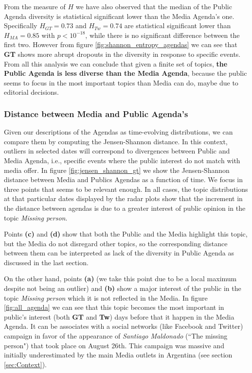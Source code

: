 \documentclass{bmcart}
\begin{document}
\par From the measure of $H$ we have also observed that the median of the Public Agenda diversity is statistical significant lower than the Media Agenda's one.
Specifically $H_{GT} = 0.73$ and $H_{Tw} = 0.74$ are statistical significant lower than $H_{MA} = 0.85$ with $p < 10^{-18}$, while there is no significant difference between the first two. 
However from figure \ref{fig:shannon_entropy_agendas} we can see that \textbf{GT} shows more abrupt dropouts in the diversity in response to specific events.
From all this analysis we  can conclude that given a finite set of topics, \textbf{the Public Agenda is less diverse than the Media Agenda}, because the public seems to focus in the most important topics than Media can do, maybe due to editorial decisions.

\subsubsection*{Distance between Media and Public Agenda's }

\par Given our descriptions of the Agendas as time-evolving distributions, we can  compare them by computing the Jensen-Shannon distance. In this context, outliers in selected dates will correspond to divergences between Public and Media Agenda, i.e., specific events where the public interest do not match with media offer.
In figure \ref{fig:jensen_shannon_gt} we show the Jensen-Shannon distance between Media and Publics Agendas as a function of time. We focus in three points that seems to be relevant enough. In all cases, the topic distributions at that particular dates displayed by  the radar plots show that the increment in the distance between agendas is due to a greater interest of public opinion in the topic \emph{Missing person}. 

\par Points \textbf{(c)} and \textbf{(d)} show that both the Public and the Media highlight this topic, but the Media do not disregard other topics, so the corresponding distance between them can be interpreted as lack of the diversity in Public Agenda as discussed in the last section.

\par On the other hand,  points \textbf{(a)} (we take this point due to be a local maximum despite not being an outlier) and \textbf{(b)}  show a major  interest of the public in the topic \emph{Missing person} which it is not reflected in the Media.  In figure \ref{fig:all_agenda} we can see that this topic becomes the most important in public's interest (both \textbf{GT} and \textbf{Tw}) days before that  it happen in the Media Agenda. It can be associates  with a social networks (like Facebook and Twitter) campaign  in favor  of the appearance of \emph{Santiago Maldonado} (``The missing person") that took place on  August 26th. This campaign was massive and  initially underestimated by the main Media outlets in Argentina (see section \ref{sec:Context}). 
\end{document}
